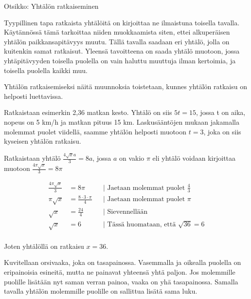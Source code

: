 
Otsikko: Yhtälön ratkaiseminen

Tyypillinen tapa ratkaista yhtälöitä on kirjoittaa ne ilmaistuna toisella tavalla.
Käytännössä tämä tarkoittaa niiden muokkaamista siten, ettei alkuperäisen yhtälön paikkansapitävyys muutu. Tällä tavalla saadaan eri yhtälö, jolla on kuitenkin samat ratkaisut. Yleensä tavoitteena on saada yhtälö muotoon, jossa yhtäpitävyyden toisella puolella on vain haluttu muuttuja ilman kertoimia, ja toisella puolella kaikki muu. 

Yhtälön ratkaisemiseksi näitä muunnoksia toistetaan, kunnes yhtälön ratkaisu on helposti luettavissa.

\begin{esimerkki}
Ratkaistaan esimerkin 2,36 matkan kesto. Yhtälö on siis $5t=15$, jossa t on aika, nopeus on 5 km/h ja matkan pituus 15 km.
Laskusääntöjen mukaan jakamalla molemmat puolet viidellä, saamme yhtälön helposti muotoon $t=3$, joka on siis kyseisen yhtälön ratkaisu.

\end{esimerkki}


\begin{esimerkki}
Ratkaistaan yhtälö $\frac{4\sqrt{x}a}{3}=8a$, jossa $a$ on vakio $\pi$ eli yhtälö voidaan kirjoittaa muotoon $\frac{4\pi\sqrt{x}}{3}=8\pi$

		\begin{align*}
			\frac{4 \pi \sqrt{x}}{3} &= 8 {\pi} && \text{| Jaetaan molemmat puolet $\frac{4}{3}$} \\
			{\pi}\sqrt{x} &= \frac{8\cdot 3\cdot {\pi}}{4} && \text{| Jaetaan molemmat puolet $\pi$} \\
			\sqrt{x} &= \frac{24}{4} && \text{| Sievennellään} \\
			\sqrt{x} &= 6 && \text{| Tässä huomataan, että $\sqrt{36}=6$} \\
\end{align*}

Joten yhtälöllä on ratkaisu $x=36$.

\end{esimerkki}

\begin{esimerkki}
	Kuvitellaan orsivaaka, joka on tasapainossa. Vasemmalla ja oikealla puolella on eripainoisia esineitä, mutta ne painavat yhteensä yhtä paljon. Jos molemmille puolille lisätään nyt saman verran painoa, vaaka on yhä tasapainossa. Samalla tavalla yhtälön molemmille puolille on sallittua lisätä sama luku.
\end{esimerkki}

